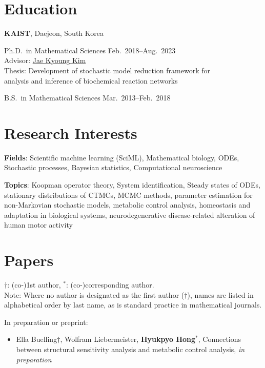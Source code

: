 \documentclass[margin,line]{res}
\newenvironment{list1}{
  \begin{list}{\ding{113}}{%
      \setlength{\itemsep}{0in}
      \setlength{\parsep}{0in} \setlength{\parskip}{0in}
      \setlength{\topsep}{0in} \setlength{\partopsep}{0in}
      \setlength{\leftmargin}{0.17in}}}{\end{list}}
\newcommand{\vspacesection}{\vspace*{-1.5mm}}
\begin{document}
\begin{resume}
\section{\sc Education}
{\bf KAIST}, Daejeon, South Korea\\
\begin{list1}
\item[] Ph.D.\ in Mathematical Sciences \hfill Feb.\ 2018--Aug.\ 2023 \\
Advisor: \href{https://mathsci.kaist.ac.kr/~jaekkim}{Jae Kyoung Kim} \\
Thesis: Development of stochastic model reduction framework for \\
\phantom{HHHHi} analysis and inference of biochemical reaction networks
\vspace*{.05in}
\item[] B.S.\ in Mathematical Sciences \hfill Mar.\ 2013--Feb.\ 2018
\end{list1}
\vspacesection


\section{\sc Research Interests}
\textbf{Fields}: Scientific machine learning (SciML), Mathematical biology, ODEs, Stochastic processes, Bayesian statistics, Computational neuroscience

\vspace{-10pt}
\textbf{Topics}: Koopman operator theory, System identification, Steady states of ODEs, stationary distributions of CTMCs, 
MCMC methods, parameter estimation for non-Markovian stochastic models,
metabolic control analysis, homeostasis and adaptation in biological systems,
neurodegenerative disease-related alteration of human motor activity
\vspacesection

\section{\sc Papers}
$\dagger$: (co-)1st author, ${}^*$: (co-)corresponding author. \\
Note: Where no author is designated as the first author ($\dagger$), names are listed in alphabetical order by last name, as is standard practice in mathematical journals.

\vspace{-5pt}
In preparation or preprint: \vspace{7pt}
\begin{itemize}[leftmargin=*]
    \item[18.] Ella Buelling$\dagger$, Wolfram Liebermeister, \textbf{Hyukpyo Hong}${}^*$, Connections between structural sensitivity analysis and metabolic control analysis, \textit{in preparation}


\end{itemize}
\end{resume}
\end{document}
